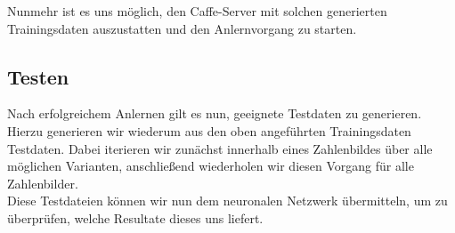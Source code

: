 Nunmehr ist es uns möglich, den Caffe-Server mit solchen generierten Trainingsdaten auszustatten und den Anlernvorgang zu starten.

\subsection{Testen}
Nach erfolgreichem Anlernen gilt es nun, geeignete Testdaten zu generieren. Hierzu generieren wir wiederum aus den oben angeführten Trainingsdaten Testdaten. Dabei iterieren wir zunächst innerhalb eines Zahlenbildes über alle möglichen Varianten, anschließend wiederholen wir diesen Vorgang für alle Zahlenbilder. \\
Diese Testdateien können wir nun dem neuronalen Netzwerk übermitteln, um zu überprüfen, welche Resultate dieses uns liefert.